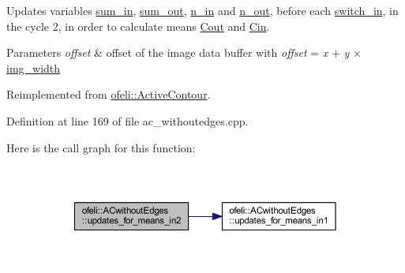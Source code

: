 Updates variables \hyperlink{classofeli_1_1_a_cwithout_edges_a14f61eabccbac71bf616674e8feb44f5}{sum\-\_\-in}, \hyperlink{classofeli_1_1_a_cwithout_edges_a799b4078bc22cbde48cc29c93727efc5}{sum\-\_\-out}, \hyperlink{classofeli_1_1_a_cwithout_edges_a8d2c28710176ae9b562b4001f8171348}{n\-\_\-in} and \hyperlink{classofeli_1_1_a_cwithout_edges_a07818e5c3700b0164037e982077de10c}{n\-\_\-out}, before each \hyperlink{classofeli_1_1_active_contour_a7d9a557b580af708155ff4ab8bbfd73b}{switch\-\_\-in}, in the cycle 2, in order to calculate means \hyperlink{classofeli_1_1_a_cwithout_edges_a02c32b73dcc676251330a42b6fb4e6f4}{Cout} and \hyperlink{classofeli_1_1_a_cwithout_edges_af26f696be73588b2a150c3eef6f62c85}{Cin}. 


\begin{DoxyParams}{Parameters}
{\em offset} & offset of the image data buffer with {\itshape offset} = {\itshape x} + {\itshape y} × \hyperlink{classofeli_1_1_active_contour_a3623de7ebc0d27ba7fac21a5929afbc6}{img\-\_\-width} \\
\hline
\end{DoxyParams}


Reimplemented from \hyperlink{classofeli_1_1_active_contour_a77e9dc7bcbd0ba48499a499891e021cb}{ofeli\-::\-Active\-Contour}.



Definition at line 169 of file ac\-\_\-withoutedges.\-cpp.



Here is the call graph for this function\-:\nopagebreak
\begin{figure}[H]
\begin{center}
\leavevmode
\includegraphics[width=350pt]{classofeli_1_1_a_cwithout_edges_aae62ec3548eb47ca5f67c2ede19a251b_cgraph}
\end{center}
\end{figure}


